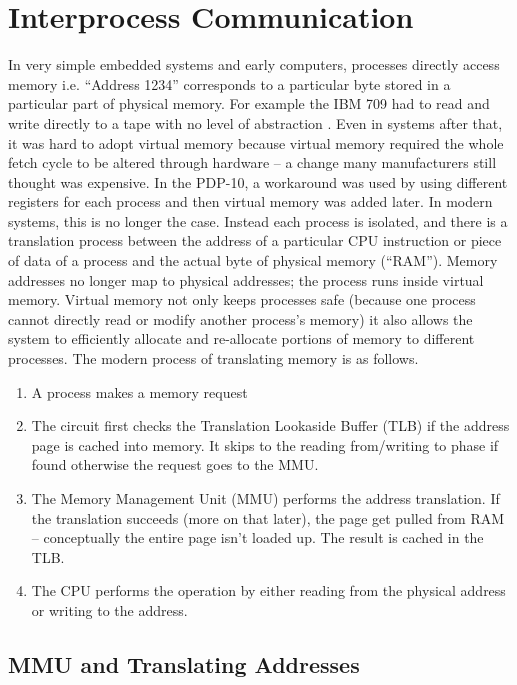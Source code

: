 \chapter{Interprocess Communication}


In very simple embedded systems and early computers, processes directly access memory i.e. ``Address 1234'' corresponds to a particular byte stored in a particular part of physical memory. For example the IBM 709 had to read and write directly to a tape with no level of abstraction \cite[P. 65]{ibm709}. Even in systems after that, it was hard to adopt virtual memory because virtual memory required the whole fetch cycle to be altered through hardware -- a change many manufacturers still thought was expensive. In the PDP-10, a workaround was used by using different registers for each process and then virtual memory was added later. In modern systems, this is no longer the case. Instead each process is isolated, and there is a translation process between the address of a particular CPU instruction or piece of data of a process and the actual byte of physical memory (``RAM''). Memory addresses no longer map to physical addresses; the process runs inside virtual memory. Virtual memory not only keeps processes safe (because one process cannot directly read or modify another process's memory) it also allows the system to efficiently allocate and re-allocate portions of memory to different processes. The modern process of translating memory is as follows.

\begin{enumerate}
\item A process makes a memory request
\item The circuit first checks the Translation Lookaside Buffer (TLB) if the address page is cached into memory. It skips to the reading from/writing to phase if found otherwise the request goes to the MMU.
\item The Memory Management Unit (MMU) performs the address translation. If the translation succeeds (more on that later), the page get pulled from RAM -- conceptually the entire page isn't loaded up. The result is cached in the TLB. 
\item The CPU performs the operation by either reading from the physical address or writing to the address.
\end{enumerate}

\section{MMU and Translating Addresses}

